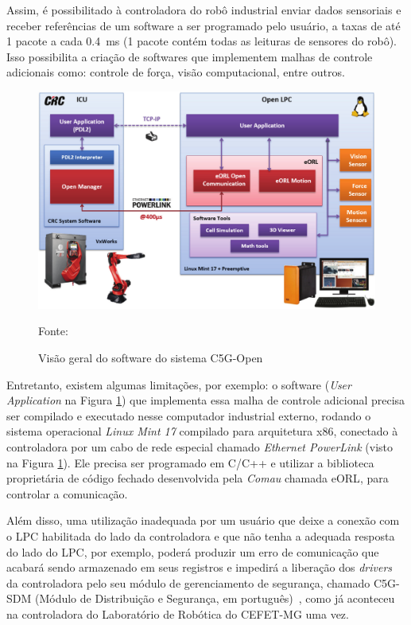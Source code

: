         Assim, é possibilitado à controladora do robô industrial enviar dados sensoriais e receber referências de um software a ser programado pelo usuário, a taxas de até 1 pacote a cada \SI{0,4}{\milli\second} (1 pacote contém todas as leituras de sensores do robô). Isso possibilita a criação de softwares que implementem malhas de controle adicionais como: controle de força, visão computacional, entre outros.~\cite{Ferrara:2013}
        
        \begin{figure}[ht]
            \centering
            \includegraphics[width=\columnwidth]{imagens/Conexoes/controladora.png}
            \small 
            \centering 
            \caption{Visão geral do software do sistema C5G-Open}
            Fonte:~\cite{Open:Manual}
            \label{controladora}
        \end{figure} 
        
        Entretanto, existem algumas limitações, por exemplo: o software (\textit{User Application} na Figura \ref{controladora}) que implementa essa malha de controle adicional precisa ser compilado e executado nesse computador industrial externo, rodando o sistema operacional \textit{Linux Mint 17} compilado para arquitetura x86, conectado à controladora por um cabo de rede especial chamado \textit{Ethernet PowerLink} (visto na Figura \ref{controladora}). Ele precisa ser programado em C/C++ e utilizar a biblioteca proprietária de código fechado desenvolvida pela \textit{Comau} chamada \ac{eORL}, para controlar a comunicação.%
        
        Além disso, uma utilização inadequada por um usuário que deixe a conexão com o \ac{LPC} habilitada do lado da controladora e que não tenha a adequada resposta do lado do \ac{LPC}, por exemplo, poderá produzir um erro de comunicação que acabará sendo armazenado em seus registros e impedirá a liberação dos \textit{drivers} da controladora pelo seu módulo de gerenciamento de segurança, chamado C5G-SDM (Módulo de Distribuição e Segurança, em português)~\cite{C5G:Manual}, como já aconteceu na controladora do Laboratório de Robótica do CEFET-MG uma vez.
        
